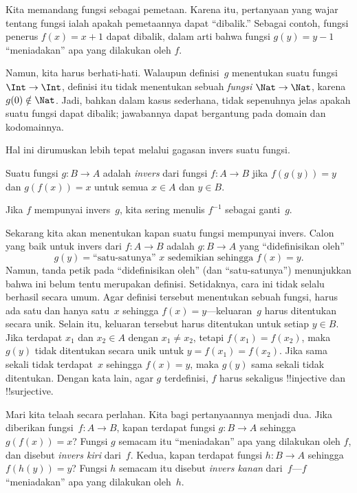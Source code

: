 \documentclass[../../../include/open-logic-section]{subfiles}
\begin{document}

\begin{explain}
Kita memandang fungsi sebagai pemetaan. Karena itu, pertanyaan yang wajar
tentang fungsi ialah apakah pemetaannya dapat ``dibalik.'' Sebagai contoh,
fungsi penerus $f(x) = x + 1$ dapat dibalik, dalam arti bahwa fungsi $g(y) = y
- 1$ ``meniadakan'' apa yang dilakukan oleh $f$.

Namun, kita harus berhati-hati. Walaupun definisi~$g$ menentukan suatu fungsi
$\Int \to \Int$, definisi itu tidak menentukan sebuah \emph{fungsi} $\Nat \to
\Nat$, karena $g(0) \notin \Nat$. Jadi, bahkan dalam kasus sederhana, tidak
sepenuhnya jelas apakah suatu fungsi dapat dibalik; jawabannya dapat bergantung
pada domain dan kodomainnya.

Hal ini dirumuskan lebih tepat melalui gagasan invers suatu fungsi.
\end{explain}

\begin{defn}
Suatu fungsi $g \colon B \to A$ adalah \emph{invers} dari fungsi $f \colon A
\to B$ jika $f(g(y)) = y$ dan $g(f(x)) = x$ untuk semua $x \in A$ dan $y \in
B$.
\end{defn}

Jika $f$ mempunyai invers~$g$, kita sering menulis $f^{-1}$ sebagai ganti~$g$.

\begin{explain}
Sekarang kita akan menentukan kapan suatu fungsi mempunyai invers. Calon yang
baik untuk invers dari $f\colon A \to B$ adalah $g\colon B \to A$ yang
``didefinisikan oleh''
\[
g(y) = \text{``satu-satunya'' $x$ sedemikian sehingga $f(x) = y$.}
\]
Namun, tanda petik pada ``didefinisikan oleh'' (dan ``satu-satunya'')
menunjukkan bahwa ini belum tentu merupakan definisi. Setidaknya, cara ini
tidak selalu berhasil secara umum. Agar definisi tersebut menentukan sebuah
fungsi, harus ada satu dan hanya satu~$x$ sehingga $f(x) = y$---keluaran~$g$
harus ditentukan secara unik. Selain itu, keluaran tersebut harus ditentukan
untuk setiap $y \in B$. Jika terdapat $x_1$ dan $x_2 \in A$ dengan $x_1 \neq
x_2$, tetapi $f(x_1) = f(x_2)$, maka $g(y)$ tidak ditentukan secara unik untuk
$y = f(x_1) = f(x_2)$. Jika sama sekali tidak terdapat~$x$ sehingga $f(x) =
y$, maka $g(y)$ sama sekali tidak ditentukan. Dengan kata lain, agar $g$
terdefinisi, $f$ harus sekaligus !!{injective} dan !!{surjective}.

Mari kita telaah secara perlahan. Kita bagi pertanyaannya menjadi dua. Jika
diberikan fungsi~$f\colon A \to B$, kapan terdapat fungsi $g\colon B \to A$
sehingga $g(f(x)) = x$? Fungsi $g$ semacam itu ``meniadakan'' apa yang
dilakukan oleh $f$, dan disebut \emph{invers kiri} dari~$f$. Kedua, kapan
terdapat fungsi $h\colon B \to A$ sehingga $f(h(y)) = y$? Fungsi $h$ semacam
itu disebut \emph{invers kanan} dari~$f$---$f$ ``meniadakan'' apa yang
dilakukan oleh~$h$.
\end{explain}
\end{document}
